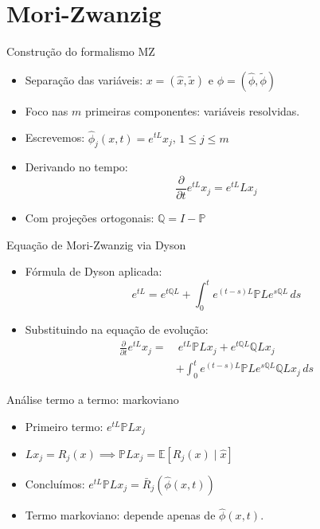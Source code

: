 
\section{Mori-Zwanzig}

\begin{frame}{Construção do formalismo MZ}
\begin{itemize}
    \item Separação das variáveis: $x = (\hat{x}, \tilde{x})$ e $\phi = (\hat{\phi}, \tilde{\phi})$
    \item Foco nas $m$ primeiras componentes: variáveis resolvidas.
    \item Escrevemos: $\hat{\phi}_j(x,t) = e^{tL}x_j$, $1 \leq j \leq m$
    \item Derivando no tempo:
    \begin{equation*}
        \frac{\partial}{\partial t}e^{tL}x_j = e^{tL}Lx_j
    \end{equation*}
    \item Com projeções ortogonais: $\mathbb{Q} = I - \mathbb{P}$
\end{itemize}
\end{frame}

\begin{frame}{Equação de Mori-Zwanzig via Dyson}
\begin{itemize}
    \item Fórmula de Dyson aplicada:
    \begin{equation*}
        e^{tL} = e^{t\mathbb{Q}L} + \int_0^t e^{(t-s)L} \mathbb{P}L e^{s\mathbb{Q}L} \, ds
    \end{equation*}
    \item Substituindo na equação de evolução:
    \begin{align*}
        \frac{\partial}{\partial t} e^{tL} x_j = &\ e^{tL} \mathbb{P}L x_j + e^{t\mathbb{Q}L} \mathbb{Q}L x_j \\
        &+ \int_0^t e^{(t-s)L} \mathbb{P}L e^{s\mathbb{Q}L} \mathbb{Q}L x_j \, ds
    \end{align*}
\end{itemize}
\end{frame}

\begin{frame}{Análise termo a termo: markoviano}
\begin{itemize}
    \item Primeiro termo: $e^{tL} \mathbb{P}L x_j$
    \item $Lx_j = R_j(x) \implies \mathbb{P}Lx_j = \mathbb{E}[R_j(x) \mid \hat{x}]$
    \item Concluímos: $e^{tL} \mathbb{P}Lx_j = \bar{R}_j(\hat{\phi}(x,t))$
    \item Termo markoviano: depende apenas de $\hat{\phi}(x,t)$.
\end{itemize}
\end{frame}

